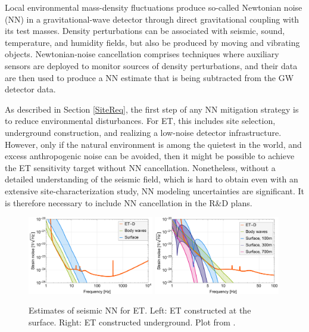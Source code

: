 \FloatBarrier
\label{sec:mitigateNN}
Local environmental mass-density fluctuations produce so-called Newtonian noise (NN) in a gravitational-wave detector through direct gravitational coupling with its test masses. Density perturbations can be associated with seismic, sound, temperature, and humidity fields, but also be produced by moving and vibrating objects. Newtonian-noise cancellation comprises techniques where auxiliary sensors are deployed to monitor sources of density perturbations, and their data are then used to produce a NN estimate that is being subtracted from the GW detector data.

As described in Section \ref{SiteReq}, the first step of any NN mitigation strategy is to reduce environmental disturbances. For ET, this includes site selection, underground construction, and realizing a low-noise detector infrastructure. However, only if the natural environment is among the quietest in the world, and excess anthropogenic noise can be avoided, then it might be possible to achieve the ET sensitivity target without NN cancellation. Nonetheless, without a detailed understanding of the seismic field, which is hard to obtain even with an extensive site-characterization study, NN modeling uncertainties are significant. It is therefore necessary to include NN cancellation in the R\&D plans.
\begin{figure}[t!]
    \centering
    \includegraphics[width=0.49\textwidth]{./Detector/NewtonianNoise/NewtonianNoiseFigures/Seismic_Surf.pdf}
    \includegraphics[width=0.49\textwidth]{./Detector/NewtonianNoise/NewtonianNoiseFigures/Seismic_UG.pdf}
    \caption{Estimates of seismic NN for ET. Left: ET constructed at the surface. Right: ET constructed underground. Plot from \cite{BaHa2019}.}
    \label{fig:NNestimates}
\end{figure}

